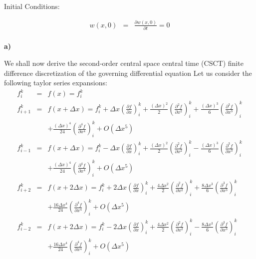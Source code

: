 \documentclass[a4paper]{article}
\begin{document}
Initial Conditions:

\begin{eqnarray*}
w(x,0) & = & \frac{\partial w(x,0)}{\partial t}  =   0\\
\end{eqnarray*}

\pagebreak

\textbf{a)}

We shall now derive the second-order central space central time (CSCT) finite difference discretization of the governing differential equation Let us consider the following taylor series expansions:
\begin{eqnarray*}
f^{k}_{i} & = & f(x)  = f^{k}_{i}\\
f^{k}_{i+1} & = & f(x + \Delta x)  = f^{k}_{i} +\Delta x (\frac{\partial f}{\partial x})^{k}_{i} + \frac{(\Delta x)^{2}}{2} (\frac{\partial^{2} f}{\partial x^{2}})^{k}_{i} + \frac{(\Delta x)^{3}}{6} (\frac{\partial^{3} f}{\partial x^{3}})^{k}_{i}\\
& & +\frac{(\Delta x)^{4}}{24} (\frac{\partial^{4} f}{\partial x^{4}})^{k}_{i} + O(\Delta x^{5})\\
f^{k}_{i-1} & = & f(x + \Delta x)  = f^{k}_{i}-\Delta x (\frac{\partial f}{\partial x})^{k}_{i} + \frac{(\Delta x)^{2}}{2} (\frac{\partial^{2} f}{\partial x^{2}})^{k}_{i} - \frac{(\Delta x)^{3}}{6} (\frac{\partial^{3} f}{\partial x^{3}})^{k}_{i}\\
& & +\frac{(\Delta x)^{4}}{24} (\frac{\partial^{4} f}{\partial x^{4}})^{k}_{i} + O(\Delta x^{5})\\
f^{k}_{i+2} & = & f(x + 2\Delta x)  = f^{k}_{i}+ 2 \Delta x (\frac{\partial f}{\partial x})^{k}_{i}+\frac{4\Delta x^{2}}{2}(\frac{\partial ^{2} f}{\partial x^{2}})^{k}_{i}+\frac{8\Delta x^{3}}{6}(\frac{\partial ^{3} f}{\partial x^{3}})^{k}_{i}\\
& & +\frac{16\Delta x^{4}}{24}(\frac{\partial ^{4} f}{\partial x^{4}})^{k}_{i} + O(\Delta x^{5})\\
f^{k}_{i-2} & = & f(x + 2\Delta x)  = f^{k}_{i} - 2 \Delta x (\frac{\partial f}{\partial x})^{k}_{i}+\frac{4\Delta x^{2}}{2}(\frac{\partial ^{2} f}{\partial x^{2}})^{k}_{i}-\frac{8\Delta x^{3}}{6}(\frac{\partial ^{3} f}{\partial x^{3}})^{k}_{i}\\
& & +\frac{16\Delta x^{4}}{24}(\frac{\partial ^{4} f}{\partial x^{4}})^{k}_{i} + O(\Delta x^{5})\\
\end{eqnarray*}
\end{document}
